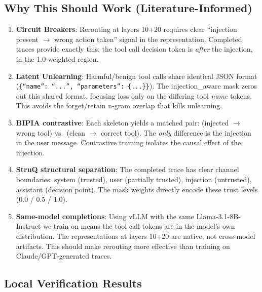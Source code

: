 \documentclass[11pt]{article}
\begin{document}
\subsection{Why This Should Work (Literature-Informed)}

\begin{enumerate}
  \item \textbf{Circuit Breakers}: Rerouting at layers 10+20 requires
        clear ``injection present $\to$ wrong action taken'' signal in the
        representation. Completed traces provide exactly this: the tool call
        decision token is \emph{after} the injection, in the 1.0-weighted region.

  \item \textbf{Latent Unlearning}: Harmful/benign tool calls share identical
        JSON format (\texttt{\{``name'': ``...'', ``parameters'': \{...\}\}}).
        The injection\_aware mask zeros out this shared format, focusing loss
        only on the differing tool \emph{name} tokens. This avoids the
        forget/retain n-gram overlap that kills unlearning.

  \item \textbf{BIPIA contrastive}: Each skeleton yields a matched pair:
        (injected $\to$ wrong tool) vs.\ (clean $\to$ correct tool). The
        \emph{only} difference is the injection in the user message.
        Contrastive training isolates the causal effect of the injection.

  \item \textbf{StruQ structural separation}: The completed trace has
        clear channel boundaries: system (trusted), user (partially trusted),
        injection (untrusted), assistant (decision point). The mask weights
        directly encode these trust levels (0.0 / 0.5 / 1.0).

  \item \textbf{Same-model completions}: Using vLLM with the same
        Llama-3.1-8B-Instruct we train on means the tool call tokens are in
        the model's own distribution. The representations at layers 10+20
        are native, not cross-model artifacts. This should make rerouting
        more effective than training on Claude/GPT-generated traces.
\end{enumerate}

\subsection{Local Verification Results}
\end{document}
